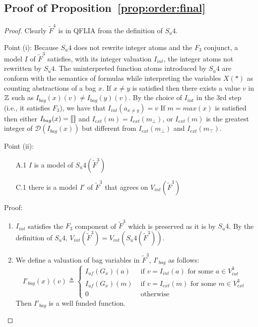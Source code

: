 \subsection{Proof of Proposition~\ref{prop:order:final}}



\begin{proof}
Clearly $\tilde{F}^4$ is in QFLIA from the definition of $S_{u}4$.

Point (i): Because $S_{u}4$ does not rewrite integer atoms and the $F_3$ conjunct, a model $I$ of $\tilde{F}^3$ satisfies, with its integer valuation $I_{int}$, the integer atoms not rewritten by $S_{u}4$.
The uninterpreted function atoms introduced by $S_{u}4$ are conform with the semantics of formulas while interpreting the variables $X(*)$ as counting abstractions of a bag $x$.
If $x \neq y$ is satisfied then there exists a value $v$ in $\mathbb{Z}$ such as $I_{bag}(x)(v) \neq I_{bag}(y)(v)$. By the choice of $I_{int}$ in the 3rd step (i.e., it satisfies $F_3$), we have that $I_{int}(a_{x\neq y}) = v$
If $m = max(x)$ is satisfied then either $I_{bag}(x) = \llbracket  \rrbracket $ and $I_{ext}(m) = I_{ext}(m_{\bot})$, or $I_{ext}(m)$ is the greatest integer of $\mathcal{D}(I_{bag}(x))$ but different from $I_{ext}(m_{\bot})$ and $I_{ext}(m_{\top})$.

Point (ii):
\begin{enumerate}
\item[A.1] $I$ is a model of $S_{u}4(\tilde{F}^3)$
\item[C.1] there is a model $I'$ of $\tilde{F}^3$ that agrees on $V_{int}(\tilde{F}^3)$
\end{enumerate}

Proof:
\begin{enumerate}[1.]
\item %
$I_{int}$ satisfies the $F_3$ component of $\tilde{F}^3$ which is preserved as it is by $S_{u}4$.
By the definition of $S_{u}4$, $V_{int}(\tilde{F}^3) = V_{int}(S_{u}4(\tilde{F}^3))$.

\item %
We define a valuation of bag variables in $\tilde{F}^3$, $I'_{bag}$ as follows:
$$
I'_{bag}(x)(v) \triangleq \left\{\begin{array}{ll}
I_{\textit{uf}}(G_{x})(a) & \mbox{ if } v = I_{int}(a) \mbox{ for some }a\in V^3_{int} \\
I_{\textit{uf}}(G_{x})(m) & \mbox{ if } v = I_{ext}(m) \mbox{ for some }m\in V^3_{ext} \\
0 & \mbox{ otherwise}
\end{array}\right.
$$
Then $I'_{bag}$ is a well funded function.


\end{enumerate}
\end{proof}
